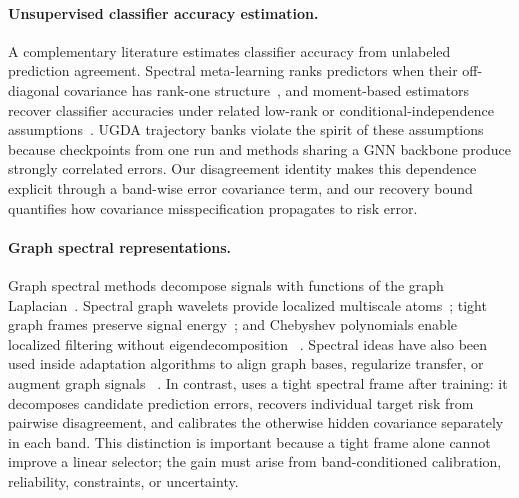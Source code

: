 \paragraph{Unsupervised classifier accuracy estimation.}
A complementary literature estimates classifier accuracy from unlabeled
prediction agreement. Spectral meta-learning ranks predictors when their
off-diagonal covariance has rank-one structure~\citep{parisi2014ranking}, and
moment-based estimators recover classifier accuracies under related low-rank or
conditional-independence assumptions~\citep{pmlr-v38-jaffe15}. UGDA trajectory
banks violate the spirit of these
assumptions because checkpoints from one run and methods sharing a GNN backbone
produce strongly correlated errors. Our disagreement identity makes this
dependence explicit through a band-wise error covariance term, and our recovery
bound quantifies how covariance misspecification propagates to risk error.

\paragraph{Graph spectral representations.}
Graph spectral methods decompose signals with functions of the graph
Laplacian~\citep{shuman2013emerging}. Spectral graph wavelets provide localized
multiscale atoms~\citep{hammond2011wavelets}; tight graph frames preserve signal
energy~\citep{shuman2013spectrumadaptedtightgraphwavelet}; and Chebyshev
polynomials enable localized filtering without eigendecomposition
~\citep{defferrard2016convolutional}.
Spectral ideas have also been used inside adaptation algorithms to align graph
bases, regularize transfer, or augment graph signals
~\citep{xiao2023spa,pang2023sa,yang2025disentangled}. In contrast, \method uses a tight
spectral frame after training: it decomposes candidate prediction errors,
recovers individual target risk from pairwise disagreement, and calibrates the
otherwise hidden covariance separately in each band. This distinction is
important because a tight frame alone cannot improve a linear selector; the
gain must arise from band-conditioned calibration, reliability, constraints,
or uncertainty.
